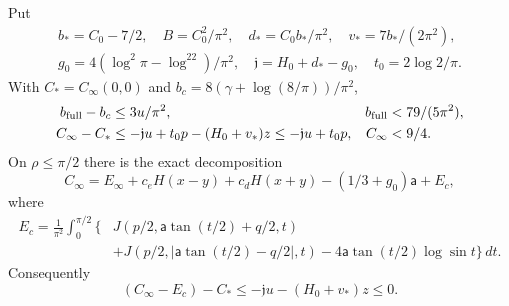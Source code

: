 \begin{lemma}\label{uc:master}
Put
\[
 \begin{gathered}
 b_*=C_0-7/2,\quad B=C_0^2/\pi^2,\quad d_*=C_0b_*/\pi^2,
 \quad v_*=7b_*/(2\pi^2),\\
 g_0=4(\log^2\pi-\log^22)/\pi^2,\quad
 \mathfrak{j}=H_0+d_*-g_0,\quad t_0=2\log2/\pi.
 \end{gathered}
\]
With $C_*=C_\infty(0,0)$ and $b_c=8(\gamma+\log(8/\pi))/\pi^2$,
\begin{align}\label{uc:model-loss}
 b_{\rm full}-b_c&\leq3u/\pi^2,& b_{\rm full}&<79/(5\pi^2),\notag\\
 C_\infty-C_*&\leq-\mathfrak{j}u+t_0p-(H_0+v_*)z\leq-\mathfrak{j}u+t_0p,
 &C_\infty&<9/4.
\end{align}
On $\rho\leq\pi/2$ there is the exact decomposition
\begin{equation}\label{uc:central-decomposition}
 C_\infty=E_\infty+c_eH(x-y)+c_dH(x+y)-(1/3+g_0)\mathsf{a}+E_c,
\end{equation}
where
\begin{equation}\label{uc:Ec}
 \begin{aligned}
 E_c=\frac1{\pi^2}\int_0^{\pi/2}
 \bigl\{&J(p/2,\mathsf{a}\tan(t/2)+q/2,t)\\
 &+J(p/2,|\mathsf{a}\tan(t/2)-q/2|,t)-4\mathsf{a}\tan(t/2)\log\sin t\bigr\}\,dt.
 \end{aligned}
\end{equation}
Consequently
\begin{equation}\label{uc:regular-loss}
 (C_\infty-E_c)-C_*\leq-\mathfrak{j}u-(H_0+v_*)z\leq0.
\end{equation}
\end{lemma}
